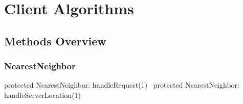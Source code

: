 \part{Client Algorithms}%
\label{part-client}

\chapter{Methods Overview}
\label{client-overview}

\renewcommand{\thepage}{\arabic{page}}
\setcounter{page}{1}

\section{NearestNeighbor}

\endmoddef\nwstartdeflinemarkup{}\nwenddeflinemarkup
protected \LA{}NearestNeighbor: handleRequest(1)~{\nwtagstyle{}}\RA{}
protected \LA{}NearestNeighbor: handleServerLocation(1)~{\nwtagstyle{}}\RA{}
\nwendcode{}

